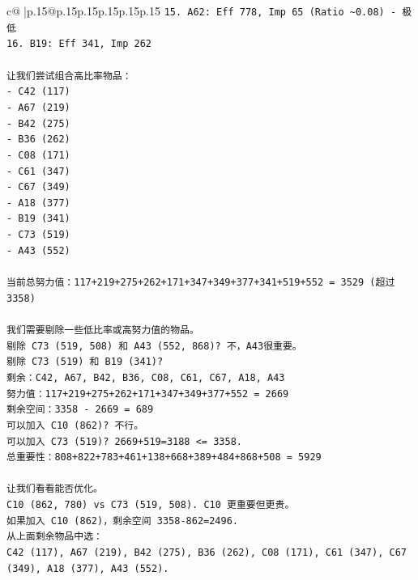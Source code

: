 \documentclass{article}
\begin{document}
{\begin{supertabular}{c@{$\;$}|p{.15\linewidth}@{}p{.15\linewidth}p{.15\linewidth}p{.15\linewidth}p{.15\linewidth}p{.15\linewidth}}
{{{\texttt{15. A62: Eff 778, Imp 65 (Ratio \textasciitilde{}0.08) {-} 极低} \\
\texttt{16. B19: Eff 341, Imp 262} \\
\\ 
\texttt{让我们尝试组合高比率物品：} \\
\texttt{{-} C42 (117)} \\
\texttt{{-} A67 (219)} \\
\texttt{{-} B42 (275)} \\
\texttt{{-} B36 (262)} \\
\texttt{{-} C08 (171)} \\
\texttt{{-} C61 (347)} \\
\texttt{{-} C67 (349)} \\
\texttt{{-} A18 (377)} \\
\texttt{{-} B19 (341)} \\
\texttt{{-} C73 (519)} \\
\texttt{{-} A43 (552)} \\
\\ 
\texttt{当前总努力值：117+219+275+262+171+347+349+377+341+519+552 = 3529 (超过3358)} \\
\\ 
\texttt{我们需要剔除一些低比率或高努力值的物品。} \\
\texttt{剔除 C73 (519, 508) 和 A43 (552, 868)? 不，A43很重要。} \\
\texttt{剔除 C73 (519) 和 B19 (341)?} \\
\texttt{剩余：C42, A67, B42, B36, C08, C61, C67, A18, A43} \\
\texttt{努力值：117+219+275+262+171+347+349+377+552 = 2669} \\
\texttt{剩余空间：3358 {-} 2669 = 689} \\
\texttt{可以加入 C10 (862)? 不行。} \\
\texttt{可以加入 C73 (519)? 2669+519=3188 <= 3358.} \\
\texttt{总重要性：808+822+783+461+138+668+389+484+868+508 = 5929} \\
\\ 
\texttt{让我们看看能否优化。} \\
\texttt{C10 (862, 780) vs C73 (519, 508). C10 更重要但更贵。} \\
\texttt{如果加入 C10 (862)，剩余空间 3358{-}862=2496.} \\
\texttt{从上面剩余物品中选：} \\
\texttt{C42 (117), A67 (219), B42 (275), B36 (262), C08 (171), C61 (347), C67 (349), A18 (377), A43 (552).} \\
}}}
\end{supertabular}}
\end{document}
